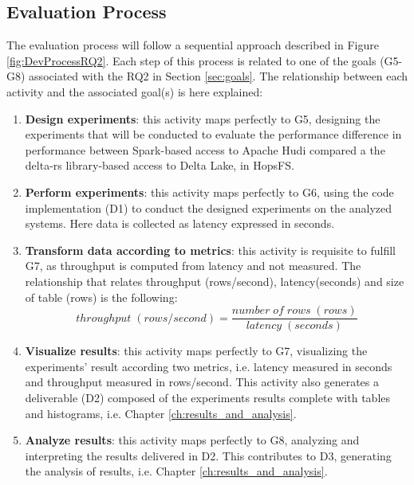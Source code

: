 \subsection{Evaluation Process}
\label{subsec:eval_process_and_research_paradigm}
The evaluation process will follow a sequential approach described in Figure \ref{fig:DevProcessRQ2}. Each step of this process is related to one of the goals (G5-G8) associated with the RQ2 in Section \ref{sec:goals}.
The relationship between each activity and the associated goal(s) is here explained:
\begin{enumerate}
    \item \textbf{Design experiments}: this activity maps perfectly to G5, designing the experiments that will be conducted to evaluate the performance difference in performance between Spark-based access to Apache Hudi compared a the delta-rs \cite{DeltaioDeltars2024} library-based access to Delta Lake, in \gls{HopsFS}. 
    \item \textbf{Perform experiments}: this activity maps perfectly to G6, using the code implementation (D1) to conduct the designed experiments on the analyzed systems. Here data is collected as latency expressed in seconds.
    \item \textbf{Transform data according to metrics}: this activity is requisite to fulfill G7, as throughput is computed from latency and not measured. The relationship that relates throughput (rows/second), latency(seconds) and size of table (rows) is the following:
    \[ throughput \; (rows/second) = \frac{number \; of \; rows \; (rows)}{latency \;(seconds)}\]
    \item \textbf{Visualize results}: this activity maps perfectly to G7, visualizing the experiments' result according two metrics, i.e. latency measured in seconds and throughput measured in rows/second. This activity also generates a deliverable (D2) composed of the experiments results complete with tables and histograms, i.e. Chapter \ref{ch:results_and_analysis}.
    \item \textbf{Analyze results}: this activity maps perfectly to G8, analyzing and interpreting the results delivered in D2. This contributes to D3, generating the analysis of results, i.e. Chapter \ref{ch:results_and_analysis}.
\end{enumerate}
